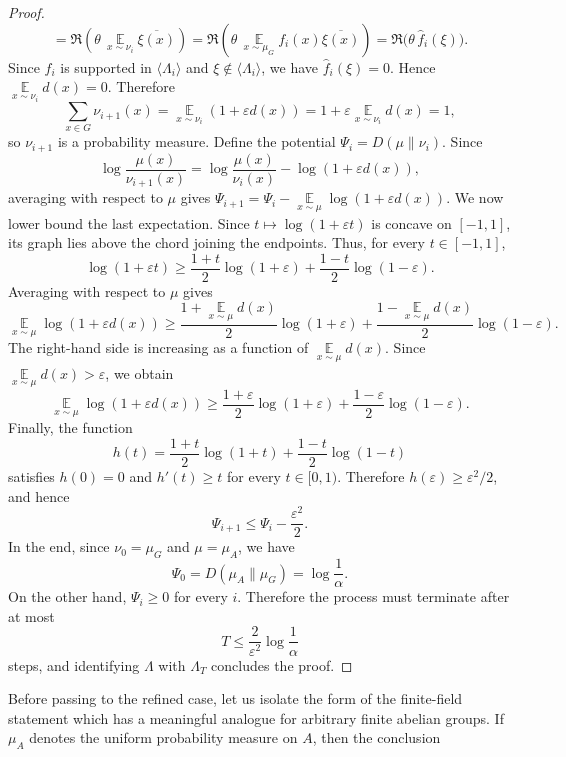 \documentclass[11pt,reqno]{amsart}
\theoremstyle{plain}
\theoremstyle{remark}
\begin{document}
\begin{proof}
$$=
\Re\left(
\theta\,
\mathop{\mathbb E}\limits_{x\sim\nu_i}\overline{\xi(x)}
\right)
=
\Re\left(
\theta\,
\mathop{\mathbb E}\limits_{x\sim\mu_G}f_i(x)\overline{\xi(x)}
\right)
=
\Re\bigl(\theta\,\widehat f_i(\xi)\bigr).
$$
Since $\widehat f_i$ is supported in $\langle\Lambda_i\rangle$ and
$\xi\notin\langle\Lambda_i\rangle$, we have $\widehat f_i(\xi)=0$. Hence
$
\mathop{\mathbb E}\limits_{x\sim\nu_i}d(x)=0.
$
Therefore
$$
\sum_{x\in G}\nu_{i+1}(x)
=
\mathop{\mathbb E}\limits_{x\sim\nu_i}(1+\varepsilon d(x))
=
1+\varepsilon\mathop{\mathbb E}\limits_{x\sim\nu_i}d(x)
=
1,
$$
so $\nu_{i+1}$ is a probability measure. Define the potential $\Psi_i=D(\mu\|\nu_i)$. Since
$$
\log\frac{\mu(x)}{\nu_{i+1}(x)}
=
\log\frac{\mu(x)}{\nu_i(x)}
-
\log(1+\varepsilon d(x)),
$$
averaging with respect to $\mu$ gives
$
\Psi_{i+1}
=
\Psi_i-
\mathop{\mathbb E}\limits_{x\sim\mu}\log(1+\varepsilon d(x)).
$
We now lower bound the last expectation. Since $t\mapsto \log(1+\varepsilon t)$
is concave on $[-1,1]$, its graph lies above the chord joining the endpoints.
Thus, for every $t\in[-1,1]$,
$$
\log(1+\varepsilon t)
\ge
\frac{1+t}{2}\log(1+\varepsilon)
+
\frac{1-t}{2}\log(1-\varepsilon).
$$
Averaging with respect to $\mu$ gives
$$
\mathop{\mathbb E}\limits_{x\sim\mu}\log(1+\varepsilon d(x))
\ge
\frac{1+\mathop{\mathbb E}\limits_{x\sim\mu}d(x)}{2}\log(1+\varepsilon)
+
\frac{1-\mathop{\mathbb E}\limits_{x\sim\mu}d(x)}{2}\log(1-\varepsilon).
$$
The right-hand side is increasing as a function of
$\mathop{\mathbb E}\limits_{x\sim\mu}d(x)$. Since
$\mathop{\mathbb E}\limits_{x\sim\mu}d(x)>\varepsilon$, we obtain
$$
\mathop{\mathbb E}\limits_{x\sim\mu}\log(1+\varepsilon d(x))
\ge
\frac{1+\varepsilon}{2}\log(1+\varepsilon)
+
\frac{1-\varepsilon}{2}\log(1-\varepsilon).
$$
Finally, the function
$$
h(t)=
\frac{1+t}{2}\log(1+t)
+
\frac{1-t}{2}\log(1-t)
$$
satisfies $h(0)=0$ and $h'(t)\ge t
$
for every $t\in[0,1)$. Therefore $h(\varepsilon)\ge \varepsilon^2/2$, and hence
$$
\Psi_{i+1}
\le
\Psi_i-\frac{\varepsilon^2}{2}.
$$
In the end, since $\nu_0=\mu_G$ and $\mu=\mu_A$, we have
$$
\Psi_0=D(\mu_A\|\mu_G)=\log\frac{1}{\alpha}.
$$
On the other hand, $\Psi_i\ge 0$ for every $i$. Therefore the process must
terminate after at most
$$
T\le \frac{2}{\varepsilon^2}\log\frac{1}{\alpha}
$$
steps, and identifying $\Lambda$ with $\Lambda_T$ concludes the proof.
\end{proof}
Before passing to the refined case, let us isolate the form of the finite-field
statement which has a meaningful analogue for arbitrary finite abelian groups.
If $\mu_A$ denotes the uniform probability measure on $A$, then the conclusion
\end{document}
